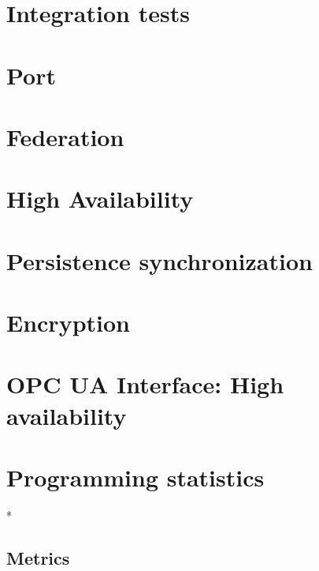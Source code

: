 
\section{Integration tests}

\section{Port}\label{sec:res:port}


\section{Federation}\label{sec:res:cluster}

\section{High Availability}\label{sec:res:ha}

\section{Persistence synchronization}\label{sec:res:psync}

\section{Encryption}\label{sec:res:security}

\section{OPC UA Interface: High availability}\label{sec:res:opc-ua}



\section{Programming statistics}

* %
\subsection{Metrics}


